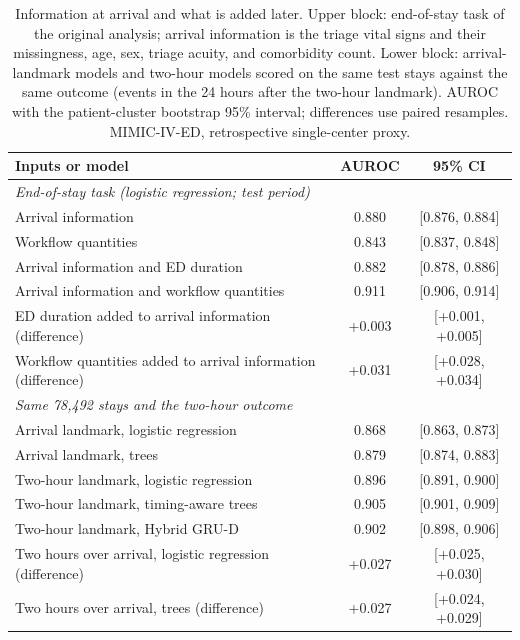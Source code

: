 \begin{table}[t]
\centering
\caption{Information at arrival and what is added later. Upper block: end-of-stay task of the original analysis; arrival information is the triage vital signs and their missingness, age, sex, triage acuity, and comorbidity count. Lower block: arrival-landmark models and two-hour models scored on the same test stays against the same outcome (events in the 24 hours after the two-hour landmark). AUROC with the patient-cluster bootstrap 95\% interval; differences use paired resamples. MIMIC-IV-ED, retrospective single-center proxy.}
\label{tab:arrival}
\begin{tabular}{lcc}
\toprule
Inputs or model & AUROC & 95\% CI \\
\midrule
\multicolumn{3}{l}{\emph{End-of-stay task (logistic regression; test period)}} \\
Arrival information & 0.880 & [0.876, 0.884] \\
Workflow quantities & 0.843 & [0.837, 0.848] \\
Arrival information and ED duration & 0.882 & [0.878, 0.886] \\
Arrival information and workflow quantities & 0.911 & [0.906, 0.914] \\
ED duration added to arrival information (difference) & +0.003 & [+0.001, +0.005] \\
Workflow quantities added to arrival information (difference) & +0.031 & [+0.028, +0.034] \\
\midrule
\multicolumn{3}{l}{\emph{Same 78,492 stays and the two-hour outcome}} \\
Arrival landmark, logistic regression & 0.868 & [0.863, 0.873] \\
Arrival landmark, trees & 0.879 & [0.874, 0.883] \\
Two-hour landmark, logistic regression & 0.896 & [0.891, 0.900] \\
Two-hour landmark, timing-aware trees & 0.905 & [0.901, 0.909] \\
Two-hour landmark, Hybrid GRU-D & 0.902 & [0.898, 0.906] \\
Two hours over arrival, logistic regression (difference) & +0.027 & [+0.025, +0.030] \\
Two hours over arrival, trees (difference) & +0.027 & [+0.024, +0.029] \\
\bottomrule
\end{tabular}
\end{table}
